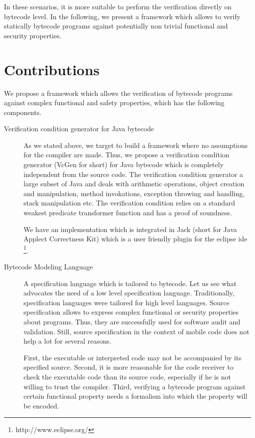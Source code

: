 In these scenarios, it is more suitable to perform the verification  directly on bytecode level.
In the following, we present a framework which allows to verify statically bytecode programs 
against potentially non trivial functional and security properties.

   \section{Contributions}
We propose a framework which allows the verification of bytecode programs against complex functional and safety properties, which has the following 
components.
\begin{description}
   \item [Verification condition generator for Java bytecode]
         As we stated above, we target to build a framework where no assumptions for the compiler are made.
	 Thus, we propose a verification condition generator (VcGen for short) for Java bytecode which is completely independent from 
	 the source code. The verification condition generator a large subset of Java and deals with
	 arithmetic operations, object creation and manipulation,
	 method invokations, exception throwing and handling, stack manipulation etc.
	 The verification condition relies on a standard weakest predicate transformer function
	 and  has a proof of soundness.
	 
	 We have an implementation which is integrated in Jack (short for Java Applect Correctness Kit) \cite{BRL-JACK} which is a user friendly 
	 plugin for the eclipse ide \footnote{http://www.eclipse.org/}. 
	 
   \item [Bytecode Modeling Language] 
         A specification language which is tailored to bytecode. Let us see what advocates the need of a
	 low level specification language. Traditionally, specification languages were tailored for high level languages.  
	 Source  specification allows to express complex functional or security properties about programs.
	 Thus, they are successfully  used for software audit and validation. Still, source specification in 
	 the context of mobile code does not help a lot for several reasons.


	 First, the executable or interpreted code  may not be accompanied by its specified  source. Second, it is more reasonable for the 
	 code receiver to check the executable code than its source code, especially if he is not willing to trust the compiler.
	 Third, verifying a bytecode program against certain functional property needs a formalism into which the property will be encoded. 



\end{description}
